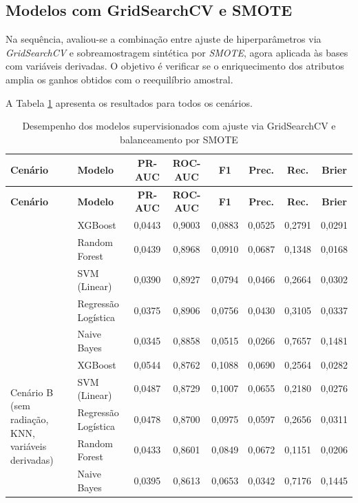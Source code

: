 \subsection{Modelos com GridSearchCV e SMOTE}

Na sequência, avaliou-se a combinação entre ajuste de hiperparâmetros via \textit{GridSearchCV} e sobreamostragem sintética por \textit{SMOTE}, agora aplicada às bases com variáveis derivadas. O objetivo é verificar se o enriquecimento dos atributos amplia os ganhos obtidos com o reequilíbrio amostral.

A Tabela \ref{tab:resultados_grid_smote_calculadas} apresenta os resultados para todos os cenários.

\begingroup
\footnotesize
\setlength{\tabcolsep}{4pt}

\begin{longtable}{p{3.4cm} l c c c c c c}
\caption{Desempenho dos modelos supervisionados com ajuste via GridSearchCV e balanceamento por SMOTE}
\label{tab:resultados_grid_smote_calculadas} \\
\toprule
\textbf{Cenário} & \textbf{Modelo} & \textbf{PR-AUC} & \textbf{ROC-AUC} & \textbf{F1} & \textbf{Prec.} & \textbf{Rec.} & \textbf{Brier} \\
\midrule
\endfirsthead

\toprule
\textbf{Cenário} & \textbf{Modelo} & \textbf{PR-AUC} & \textbf{ROC-AUC} & \textbf{F1} & \textbf{Prec.} & \textbf{Rec.} & \textbf{Brier} \\
\midrule
\endhead

\bottomrule
\endfoot

\bottomrule
\endlastfoot

\multirow{5}{*}{\parbox{3.4cm}{\centering Cenário A\\(sem radiação, variáveis derivadas)}} 
   & XGBoost             & 0,0443 & 0,9003 & 0,0883 & 0,0525 & 0,2791 & 0,0291 \\
   & Random Forest       & 0,0439 & 0,8968 & 0,0910 & 0,0687 & 0,1348 & 0,0168 \\
   & SVM (Linear)        & 0,0390 & 0,8927 & 0,0794 & 0,0466 & 0,2664 & 0,0302 \\
   & Regressão Logística & 0,0375 & 0,8906 & 0,0756 & 0,0430 & 0,3105 & 0,0337 \\
   & Naive Bayes         & 0,0345 & 0,8858 & 0,0515 & 0,0266 & 0,7657 & 0,1481 \\
\midrule

\multirow{5}{*}{\parbox{3.4cm}{\centering Cenário B\\(sem radiação, KNN, variáveis derivadas)}} 
   & XGBoost             & 0,0544 & 0,8762 & 0,1088 & 0,0690 & 0,2564 & 0,0282 \\
   & SVM (Linear)        & 0,0487 & 0,8729 & 0,1007 & 0,0655 & 0,2180 & 0,0276 \\
   & Regressão Logística & 0,0478 & 0,8700 & 0,0975 & 0,0597 & 0,2656 & 0,0311 \\
   & Random Forest       & 0,0433 & 0,8601 & 0,0849 & 0,0672 & 0,1151 & 0,0206 \\
   & Naive Bayes         & 0,0395 & 0,8613 & 0,0653 & 0,0342 & 0,7176 & 0,1445 \\
\midrule


\end{longtable}
